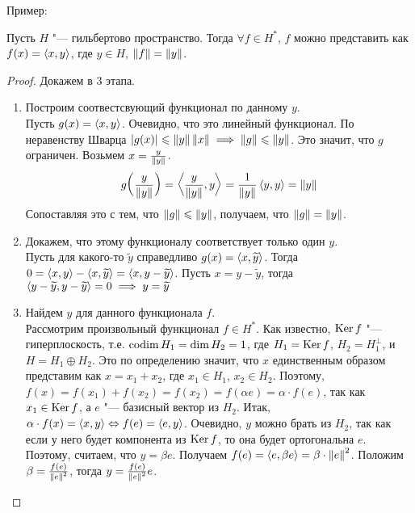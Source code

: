 Пример: \todo

\begin{theorem}
    Пусть $H$ "--- гильбертово пространство.
    Тогда $\forall f \in H^*$, $f$ можно представить как $f(x) = \left\langle x , y\right\rangle$, где $y \in H$, $\left\|f\right\| = \left\|y\right\|$.
\end{theorem}
\begin{proof}
    Докажем в 3 этапа.
    \begin{enumerate}
        \item Построим соотвестсвующий функционал по данному $y$. \\
            Пусть $g(x) = \left\langle x , y\right\rangle$. Очевидно, что это линейный функционал.
            По неравенству Шварца $\left|g(x)\right| \leqslant \left\|y\right\| \left\|x\right\| \implies \left\|g\right\| \leqslant \left\|y\right\|$.
            Это значит, что $g$ ограничен.
            Возьмем $x = \frac{y}{\left\|y\right\|}$.
            \[
                g\mathopen{}\left(\frac{y}{\left\|y\right\|}\mathclose{}\right) = \left\langle \frac{y}{\left\|y\right\|} , y\right\rangle
                    = \frac{1}{\left\|y\right\|}\left\langle y , y\right\rangle = \left\|y\right\|
            \]
            Сопоставляя это с тем, что $\left\|g\right\| \leqslant \left\|y\right\|$, получаем, что $\left\|g\right\| = \left\|y\right\|$.
        \item Докажем, что этому функционалу соответствует только один $y$. \\
            Пусть для какого-то $\widetilde{y}$ справедливо $g(x) = \left\langle x , \widetilde{y}\right\rangle$.
            Тогда $0 = \left\langle x , y\right\rangle - \left\langle x , \widetilde{y}\right\rangle = \left\langle x , y - \widetilde{y}\right\rangle$.
            Пусть $x = y - \widetilde{y}$, тогда
            $\left\langle y - \widetilde{y} , y - \widetilde{y}\right\rangle = 0 \implies y = \widetilde{y}$
        \item Найдем $y$ для данного функционала $f$. \\
            Рассмотрим произвольный функционал $f \in H^*$.
            Как известно, $\operatorname{Ker} f$ "--- гиперплоскость, т.е.
            $\operatorname{codim} H_1 = \dim H_2 = 1$, где $H_1 = \operatorname{Ker} f$, $H_2 = H_1^\bot$, и $H = H_1 \oplus H_2$.
            Это по определению значит, что $x$ единственным образом представим как $x = x_1 + x_2$, где $x_1 \in H_1$, $x_2 \in H_2$.
            Поэтому, $f(x) = f(x_1) + f(x_2) = f(x_2) = f(\alpha e) = \alpha \cdot f(e)$,
            так как $x_1 \in \operatorname{Ker} f$, а $e$ "--- базисный вектор из $H_2$.
            Итак, $\alpha \cdot f(x) = \left\langle x , y\right\rangle \Leftrightarrow f(e) = \left\langle e , y\right\rangle$.
            Очевидно, $y$ можно брать из $H_2$, так как если у него будет компонента из $\operatorname{Ker} f$, то она будет ортогональна $e$.
            Поэтому, считаем, что $y = \beta e$.
            Получаем $f(e) = \left\langle e , \beta e\right\rangle = \beta \cdot \left\|e\right\|^2$.
            Положим $\beta = \frac{f(e)}{\left\|e\right\|^2}$, тогда $y = \frac{f(e)}{\left\|e\right\|^2}e$.
    \end{enumerate}
\end{proof}


